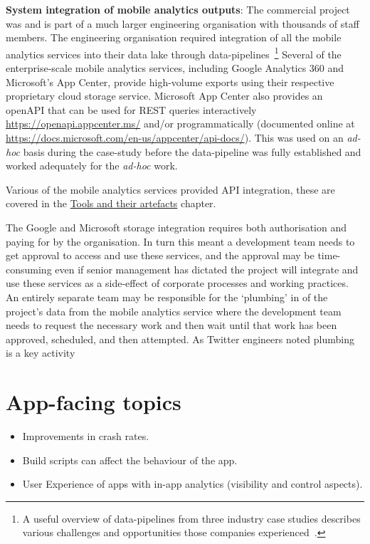 \textbf{System integration of mobile analytics outputs}: 
The commercial project was and is part of a much larger engineering organisation with thousands of staff members. The engineering organisation required integration of all the mobile analytics services into their data lake through data-pipelines~\footnote{A useful overview of data-pipelines from three industry case studies describes various challenges and opportunities those companies experienced~\citep{munappy2020_data_pipeline_management_in_practice_challenges_and_opportunities}.} Several of the enterprise-scale mobile analytics services, including Google Analytics 360 and Microsoft's App Center, provide high-volume exports using their respective proprietary cloud storage service. Microsoft App Center also provides an openAPI that can be used for REST queries interactively \url{https://openapi.appcenter.ms/} and/or programmatically (documented online at \url{https://docs.microsoft.com/en-us/appcenter/api-docs/}). This was used on an \emph{ad-hoc} basis during the case-study before the data-pipeline was fully established and worked adequately for the \emph{ad-hoc} work.  

Various of the mobile analytics services provided API integration, these are covered in the \href{chapter-tools-and-their-artefacts}{Tools and their artefacts} chapter.

The Google and Microsoft storage integration requires both authorisation and paying for by the organisation. In turn this meant a development team needs to get approval to access and use these services, and the approval may be time-consuming even if senior management has dictated the project will integrate and use these services as a side-effect of corporate processes and working practices. An entirely separate team may be responsible for the `plumbing' in of the project's data from the mobile analytics service where the development team needs to request the necessary work and then wait until that work has been approved, scheduled, and then attempted. As Twitter engineers noted plumbing is a key activity~\citep[page 6]{lin2013_scaling_big_data_mining_infrastructure_the_twitter_experience} 


\section{App-facing topics}

\begin{itemize}
    \itemsep0em
    \item Improvements in crash rates.
    \item Build scripts can affect the behaviour of the app.
    \item User Experience of apps with in-app analytics (visibility and control aspects).
\end{itemize}

